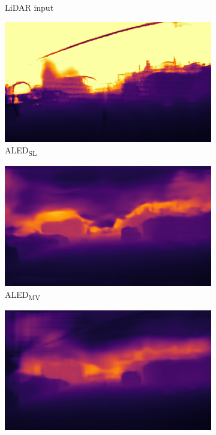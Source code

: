 \begin{figure}
\begin{subfigure}{0.31\textwidth}
    \caption{LiDAR input}
  \end{subfigure}
  \begin{subfigure}{0.31\textwidth}
    \centering
    \includegraphics[width=\textwidth]{mainmatter/figures/4_depth_conv/mvsec_cmp/ours_s_cropped.png}
    \caption{ALED\textsubscript{SL}}
  \end{subfigure}
  \hfill
  \begin{subfigure}{0.31\textwidth}
    \centering
    \includegraphics[width=\textwidth]{mainmatter/figures/4_depth_conv/mvsec_cmp/ours_r_cropped.png}
    \caption{ALED\textsubscript{MV}}\label{subfig:aled:mvsec_cmp:mv}
  \end{subfigure}
  \hfill
  \begin{subfigure}{0.31\textwidth}
    \centering
    \includegraphics[width=\textwidth]{mainmatter/figures/4_depth_conv/mvsec_cmp/ours_sr_cropped.png}

\end{subfigure}
\end{figure}
